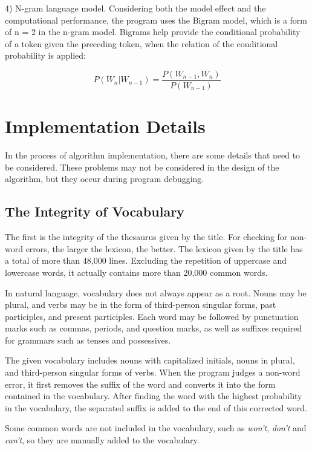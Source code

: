 \documentclass{article}
\begin{document}
4) N-gram language model. Considering both the model effect and the
computational performance, the program uses the Bigram model, which
is a form of n = 2 in the n-gram model. Bigrams help provide the conditional
probability of a token given the preceding token, when the relation
of the conditional probability is applied:

$$
P(W_{n}|W_{n-1})=\frac{P(W_{n-1},W_{n})}{P(W_{n-1})}
$$

\section{Implementation Details}

\label{sec:implementation-details}

In the process of algorithm implementation, there are some details
that need to be considered. These problems may not be considered in
the design of the algorithm, but they occur during program debugging.

\subsection{The Integrity of Vocabulary}

The first is the integrity of the thesaurus given by the title. For
checking for non-word errors, the larger the lexicon, the better.
The lexicon given by the title has a total of more than 48,000 lines.
Excluding the repetition of uppercase and lowercase words, it actually
contains more than 20,000 common words.

In natural language, vocabulary does not always appear as a root.
Nouns may be plural, and verbs may be in the form of third-person
singular forms, past participles, and present participles. Each word
may be followed by punctuation marks such as commas, periods, and
question marks, as well as suffixes required for grammars such as
tenses and possessives.

The given vocabulary includes nouns with capitalized initials, nouns
in plural, and third-person singular forms of verbs. When the program
judges a non-word error, it first removes the suffix of the word and
converts it into the form contained in the vocabulary. After finding
the word with the highest probability in the vocabulary, the separated
suffix is added to the end of this corrected word.

Some common words are not included in the vocabulary, such as \textit{won't},
\textit{don't} and \textit{can't}, so they are manually added to the
vocabulary.
\end{document}
